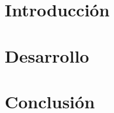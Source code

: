 \documentclass[letterpaper,12pt]{report}
\begin{document}
    
    
	\tableofcontents 
	\label{sec:Index}
	\pagebreak
	\setcounter{page}{1}
	\pagestyle{fancy}

    \chapter{Introducción}
    
    
    \chapter{Desarrollo}
    

    \chapter{Conclusión}
    
    
    
\end{document}
